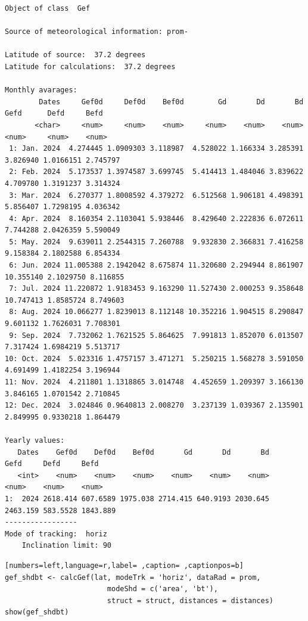 \begin{verbatim}
Object of class  Gef 

Source of meteorological information: prom- 

Latitude of source:  37.2 degrees
Latitude for calculations:  37.2 degrees

Monthly avarages:
        Dates     Gef0d     Def0d    Bef0d        Gd       Dd       Bd      Gefd      Defd     Befd
       <char>     <num>     <num>    <num>     <num>    <num>    <num>     <num>     <num>    <num>
 1: Jan. 2024  4.274445 1.0909303 3.118987  4.528022 1.166334 3.285391  3.826940 1.0166151 2.745797
 2: Feb. 2024  5.173537 1.3974587 3.699745  5.414413 1.484046 3.839622  4.709780 1.3191237 3.314324
 3: Mar. 2024  6.270377 1.8008592 4.379272  6.512568 1.906181 4.498391  5.856407 1.7298195 4.036342
 4: Apr. 2024  8.160354 2.1103041 5.938446  8.429640 2.222836 6.072611  7.744288 2.0426359 5.590049
 5: May. 2024  9.639011 2.2544315 7.260788  9.932830 2.366831 7.416258  9.158384 2.1802588 6.854334
 6: Jun. 2024 11.005388 2.1942042 8.675874 11.320680 2.294944 8.861907 10.355140 2.1029750 8.116855
 7: Jul. 2024 11.220872 1.9183453 9.163290 11.527430 2.000253 9.358648 10.747413 1.8585724 8.749603
 8: Aug. 2024 10.066277 1.8239013 8.112148 10.352216 1.904515 8.290847  9.601132 1.7626031 7.708301
 9: Sep. 2024  7.732062 1.7621525 5.864625  7.991813 1.852070 6.013507  7.317424 1.6984219 5.513717
10: Oct. 2024  5.023316 1.4757157 3.471271  5.250215 1.568278 3.591050  4.691499 1.4182254 3.196944
11: Nov. 2024  4.211801 1.1318865 3.014748  4.452659 1.209397 3.166130  3.846165 1.0701542 2.710845
12: Dec. 2024  3.024846 0.9640813 2.008270  3.237139 1.039367 2.135901  2.849995 0.9330218 1.864479

Yearly values:
   Dates    Gef0d    Def0d    Bef0d       Gd       Dd       Bd     Gefd     Defd     Befd
   <int>    <num>    <num>    <num>    <num>    <num>    <num>    <num>    <num>    <num>
1:  2024 2618.414 607.6589 1975.038 2714.415 640.9193 2030.645 2463.159 583.5528 1843.889
-----------------
Mode of tracking:  horiz 
    Inclination limit: 90
\end{verbatim}

\begin{lstlisting}[numbers=left,language=r,label= ,caption= ,captionpos=b]
gef_shdbt <- calcGef(lat, modeTrk = 'horiz', dataRad = prom,
                        modeShd = c('area', 'bt'),
                        struct = struct, distances = distances)
show(gef_shdbt)
\end{lstlisting}

